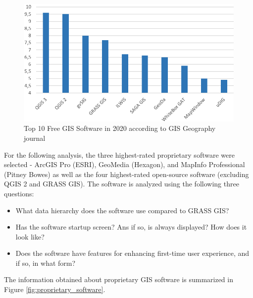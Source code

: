 \documentclass[a4paper,10pt,twoside]{article}
\begin{document}
\begin{figure}[hbt!] 
\begin{center}
\includegraphics[width=13cm]{../pictures/hodnoceni_free.png} 
\caption[Top 10 Free GIS Software in 2020 according to GISGeography journal]{Top 10 Free GIS Software in 2020 according to GIS Geography journal \cite{gisgeography}}
\label{fig:hodnoceni_free}
\end{center}
\end{figure}

\noindent For the following analysis, the three highest-rated proprietary software were selected - ArcGIS Pro (ESRI), GeoMedia (Hexagon), and MapInfo Professional (Pitney Bowes) as well as the four highest-rated open-source software (excluding QGIS 2 and GRASS GIS). The software is analyzed using the following three questions:

\begin{itemize}
\item What data hierarchy does the software use compared to GRASS GIS?
\item Has the software startup screen? Ans if so, is always displayed? How does it look like? 
\item Does the software have features for enhancing first-time user experience, and if so, in what form?
\end{itemize}

\noindent The information obtained about proprietary GIS software is summarized in Figure \ref{fig:proprietary_software}.
\end{document}
